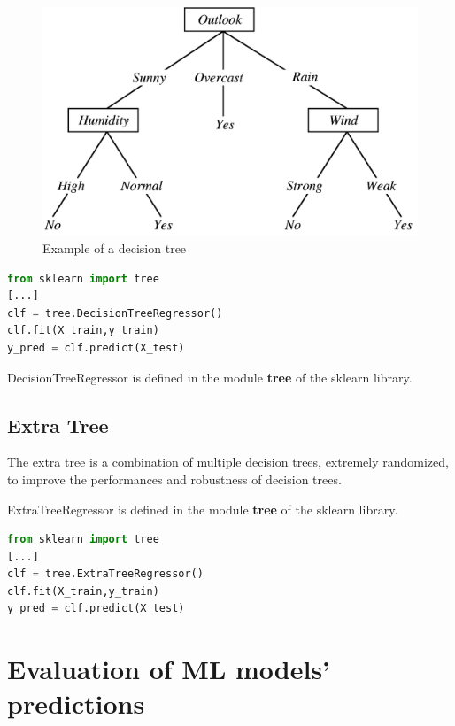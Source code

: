 \begin{figure}
    \centering
    \includegraphics[scale=0.3]{res/ML/decisiontree.png}
    \caption{Example of a decision tree}
\end{figure}

\begin{lstlisting}[language=Python, caption=Decision Tree implementation]
from sklearn import tree
[...]
clf = tree.DecisionTreeRegressor()
clf.fit(X_train,y_train)
y_pred = clf.predict(X_test)
\end{lstlisting}

DecisionTreeRegressor is defined in the module \textbf{tree} of the sklearn library.

\pagebreak

\subsection{Extra Tree}
The extra tree is a combination of multiple decision trees, extremely randomized, to improve the performances and robustness of decision trees.

ExtraTreeRegressor is defined in the module \textbf{tree} of the sklearn library.

\begin{lstlisting}[language=Python, caption=Extra Tree implementation]
from sklearn import tree
[...]
clf = tree.ExtraTreeRegressor()
clf.fit(X_train,y_train)
y_pred = clf.predict(X_test)
\end{lstlisting}




\section{Evaluation of ML models' predictions}

